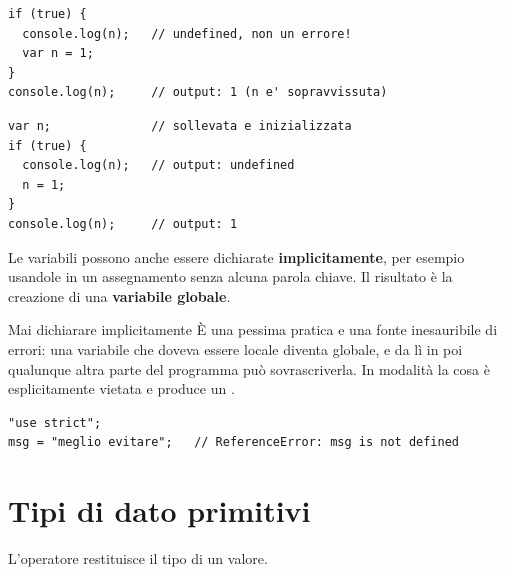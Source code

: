 \begin{affianco}[0.5]
\begin{lstlisting}[style=js, name=var.js]
if (true) {
  console.log(n);   // undefined, non un errore!
  var n = 1;
}
console.log(n);     // output: 1 (n e' sopravvissuta)
\end{lstlisting}
\risultato
\begin{lstlisting}[style=js, name=var-equivalente.js]
var n;              // sollevata e inizializzata
if (true) {
  console.log(n);   // output: undefined
  n = 1;
}
console.log(n);     // output: 1
\end{lstlisting}
\end{affianco}

Le variabili possono anche essere dichiarate \textbf{implicitamente}, per
esempio usandole in un assegnamento senza alcuna parola chiave. Il risultato è
la creazione di una \textbf{variabile globale}.

\begin{errorbox}{{Mai dichiarare implicitamente}}
  È una pessima pratica e una fonte inesauribile di errori: una variabile che
  doveva essere locale diventa globale, e da lì in poi qualunque altra parte del
  programma può sovrascriverla. In modalità  la cosa è
  esplicitamente vietata e produce un .

\begin{lstlisting}[style=js]
"use strict";
msg = "meglio evitare";   // ReferenceError: msg is not defined
\end{lstlisting}
\end{errorbox}

\section{Tipi di dato primitivi}

L'operatore  restituisce il tipo di un valore.

